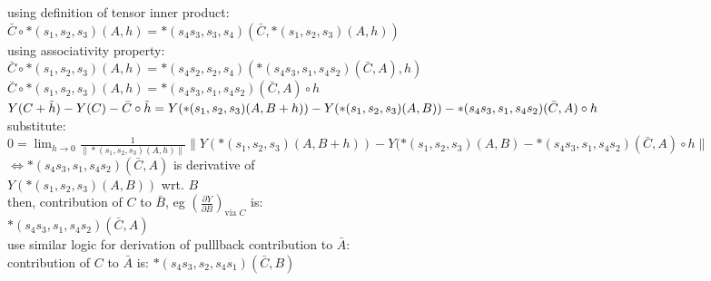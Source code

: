 \documentclass[8pt]{extarticle}
\begin{document}
\begin{multicols*}{2}
  using definition of tensor inner product:\\
  $\bar{C} \circ *(s_1, s_2, s_3)(A,h) = *(s_4 s_3, s_3, s_4)(\bar{C}, *(s_1, s_2, s_3)(A,h))$\\

  using associativity property:\\
  $\bar{C} \circ *(s_1, s_2, s_3)(A,h) = *(s_4 s_2, s_2, s_4)(*(s_4 s_3, s_1, s_4 s_2)(\bar{C}, A), h)$\\
  $\bar{C} \circ *(s_1, s_2, s_3)(A,h) = *(s_4 s_3, s_1, s_4 s_2)(\bar{C}, A) \circ h$\\

  $Y(C+\tilde{h}) - Y(C) - \bar{C} \circ \tilde{h}\\
  = Y(*(s_1,s_2,s_3)(A,B+h)) - Y(*(s_1,s_2,s_3)(A,B))\\
  - *(s_4 s_3, s_1, s_4 s_2)(\bar{C}, A) \circ h$\\

  substitute:\\
  $0=\lim_{h\rightarrow 0} \frac{1}{\|*(s_1, s_2, s_3)(A,h)\|} \|Y(*(s_1, s_2,s _3)(A,B+h)) - Y(*(s_1,s_2,s_3)(A,B) - *(s_4 s_3, s_1, s_4 s_2)(\bar{C}, A) \circ h\|$\\
  $\iff *(s_4 s_3, s_1, s_4 s_2)(\bar{C}, A)$ is derivative of\\ $Y(*(s_1, s_2, s_3)(A, B))$ wrt. $B$\\
  then, contribution of $C$ to $\bar{B}$, eg $(\frac{\partial Y}{\partial B})_{\text{via } C}$ is:\\ $*(s_4 s_3, s_1, s_4 s_2)(\bar{C}, A)$\\

  use similar logic for derivation of pulllback contribution to $\bar{A}$:\\
  contribution of $C$ to $\bar{A}$ is: $*(s_4 s_3, s_2, s_4 s_1)(\bar{C}, B)$

  \vfill\null
  \columnbreak
    
\end{multicols*}
\end{document}
